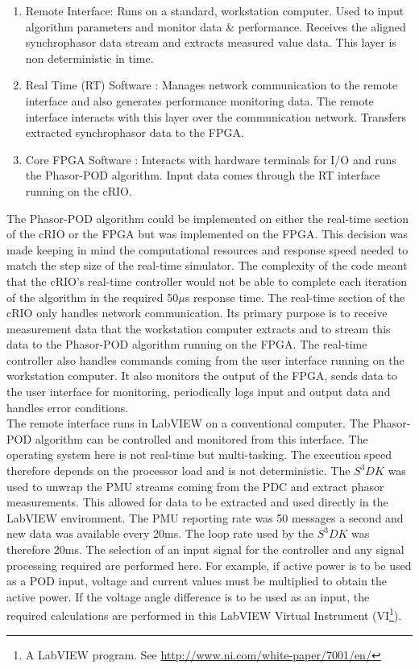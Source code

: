 \documentclass{ieeeaccess}
\begin{document}
\begin{enumerate}
\item Remote Interface: Runs on a standard, workstation computer. Used to input algorithm parameters and monitor data \& performance. Receives the aligned synchrophasor data stream and extracts measured value data. This  layer is non deterministic in time.

\item Real Time (RT) Software : Manages network communication to the remote interface and also generates performance monitoring data. The remote interface interacts with this layer over the communication network. Transfers extracted synchrophasor data to the FPGA.

\item Core FPGA Software : Interacts with hardware terminals for I/O and runs the Phasor-POD algorithm. Input data comes through the RT interface running on the cRIO.

\end{enumerate}

The Phasor-POD algorithm could be implemented on either the real-time section of the cRIO or the FPGA but was implemented on the FPGA. This decision was made keeping in mind the computational resources and response speed needed to match the step size of the real-time simulator. The complexity of the code meant that the cRIO\rq{s} real-time controller would not be able to complete each iteration of the algorithm in the required 50$\mu$s response time. The real-time section of the cRIO only handles network communication. Its primary purpose is to receive measurement data that the workstation computer extracts and to stream this data to the Phasor-POD algorithm running on the FPGA. The real-time controller also handles commands coming from the user interface running on the workstation computer.  It also monitors the output of the FPGA, sends data to the user interface for monitoring, periodically logs input and output data and handles error conditions.\\

The remote interface runs in LabVIEW on a conventional computer. The Phasor-POD algorithm can be controlled and monitored from this interface. The operating system here is not real-time but multi-tasking. The execution speed therefore depends on the processor load and is not deterministic. The  $S^{3}DK$ was used to unwrap the PMU streams coming from the PDC and extract phasor measurements. This allowed for data to be extracted and used directly in the LabVIEW environment. The PMU reporting rate was 50 messages a second and new data was available every 20ms. The loop rate used by the $S^{3}DK$ was therefore 20ms. The selection of an input signal for the controller and any signal processing required are performed here. For example, if active power is to be used as a POD input, voltage and current values must be multiplied to obtain the active power. If the voltage angle difference is to be used as an input, the required calculations are performed in this LabVIEW Virtual Instrument (VI\footnote{A LabVIEW program. See \underline{http://www.ni.com/white-paper/7001/en/}}).
\end{document}
